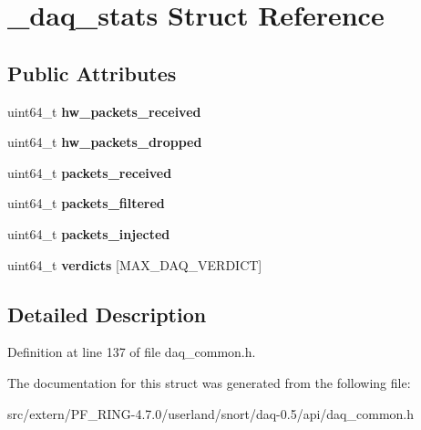 \hypertarget{struct__daq__stats}{
\section{\_\-daq\_\-stats Struct Reference}
\label{struct__daq__stats}
}
\subsection*{Public Attributes}
\begin{DoxyCompactItemize}
\item 
\hypertarget{struct__daq__stats_ae648681732cd195a36aef7ce25adc14c}{
uint64\_\-t {\bfseries hw\_\-packets\_\-received}}
\label{struct__daq__stats_ae648681732cd195a36aef7ce25adc14c}

\item 
\hypertarget{struct__daq__stats_a46fbc29a90ac7eb216f675fedafcb359}{
uint64\_\-t {\bfseries hw\_\-packets\_\-dropped}}
\label{struct__daq__stats_a46fbc29a90ac7eb216f675fedafcb359}

\item 
\hypertarget{struct__daq__stats_ad129ffe0a440a38e3ef48cc03f78cc07}{
uint64\_\-t {\bfseries packets\_\-received}}
\label{struct__daq__stats_ad129ffe0a440a38e3ef48cc03f78cc07}

\item 
\hypertarget{struct__daq__stats_af9b9fff6df7c0634e71809a4232b663b}{
uint64\_\-t {\bfseries packets\_\-filtered}}
\label{struct__daq__stats_af9b9fff6df7c0634e71809a4232b663b}

\item 
\hypertarget{struct__daq__stats_af72166d45ee75df4573d2ae7748dede4}{
uint64\_\-t {\bfseries packets\_\-injected}}
\label{struct__daq__stats_af72166d45ee75df4573d2ae7748dede4}

\item 
\hypertarget{struct__daq__stats_ab737fc730342cc194bdb09d7ce548049}{
uint64\_\-t {\bfseries verdicts} \mbox{[}MAX\_\-DAQ\_\-VERDICT\mbox{]}}
\label{struct__daq__stats_ab737fc730342cc194bdb09d7ce548049}

\end{DoxyCompactItemize}


\subsection{Detailed Description}


Definition at line 137 of file daq\_\-common.h.



The documentation for this struct was generated from the following file:\begin{DoxyCompactItemize}
\item 
src/extern/PF\_\-RING-\/4.7.0/userland/snort/daq-\/0.5/api/daq\_\-common.h\end{DoxyCompactItemize}
